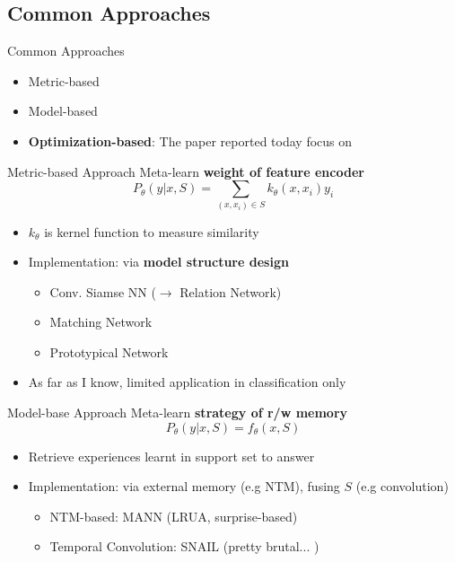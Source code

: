 \documentclass{beamer}
\begin{document}
\subsection{Common Approaches}
\begin{frame}{Common Approaches}
  \begin{itemize}
    \item Metric-based
    \item Model-based
    \item \textbf{Optimization-based}: The paper reported today focus on
  \end{itemize}
\end{frame}

\begin{frame}{Metric-based Approach}
  Meta-learn \textbf{weight of feature encoder}
  \[ P_\theta (y|x,S) = \sum_{(x,x_i) \in S} k_\theta (x,x_i) y_i \]
  \begin{itemize}
    \item $k_\theta$ is kernel function to measure similarity
    \item Implementation: via \textbf{model structure design}
      \begin{itemize}
        \item Conv. Siamse NN ($\rightarrow$ Relation Network)
        \item Matching Network
        \item Prototypical Network
      \end{itemize}
    \item As far as I know, limited application in classification only
  \end{itemize}
\end{frame}

\begin{frame}{Model-base Approach}
  Meta-learn \textbf{strategy of r/w memory}
  \[ P_\theta(y|x,S) = f_\theta(x,S) \]
  \begin{itemize}
    \item Retrieve experiences learnt in support set to answer
    \item Implementation: via external memory (e.g NTM), fusing $S$ (e.g convolution)
    \begin{itemize}
      \item NTM-based: MANN (LRUA, surprise-based)
      \item Temporal Convolution: SNAIL (pretty brutal... )
    \end{itemize}
\end{itemize}
\end{frame}
\end{document}
